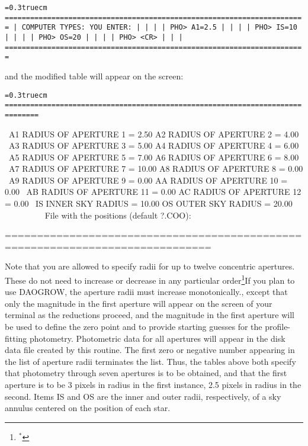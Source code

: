 \bigskip
{\noindent\obeylines\obeyspaces\frenchspacing\tt\baselineskip=0.3truecm
=======================================================================
| COMPUTER TYPES:                                  YOU ENTER:         |
|                                                                     |
| PHO>                                             A1=2.5             |
|                                                                     |
| PHO>                                             IS=10              |
|                                                                     |
| PHO>                                             OS=20              |
|                                                                     |
| PHO>                                             <CR>               |
|                                                                     |
=======================================================================
}
\bigskip

\noindent and the modified table will appear on the screen:

\bigskip
{\noindent\obeylines\obeyspaces\frenchspacing\tt\baselineskip=0.3truecm
==============================================================================

\ A1  RADIUS OF APERTURE  1 =     2.50    A2  RADIUS OF APERTURE  2 =     4.00
\ A3  RADIUS OF APERTURE  3 =     5.00    A4  RADIUS OF APERTURE  4 =     6.00
\ A5  RADIUS OF APERTURE  5 =     7.00    A6  RADIUS OF APERTURE  6 =     8.00
\ A7  RADIUS OF APERTURE  7 =    10.00    A8  RADIUS OF APERTURE  8 =     0.00
\ A9  RADIUS OF APERTURE  9 =     0.00    AA  RADIUS OF APERTURE 10 =     0.00
\ AB  RADIUS OF APERTURE 11 =     0.00    AC  RADIUS OF APERTURE 12 =     0.00
\ IS       INNER SKY RADIUS =    10.00    OS       OUTER SKY RADIUS =    20.00
~~~~~~~~
\         File with the positions (default ?.COO):

==============================================================================
}
\bigskip

\noindent Note that you are allowed to specify radii for up to twelve
concentric apertures.  These do not need to increase or decrease in any
particular order\footnote{$^*$}{If you plan to use DAOGROW, the
aperture radii must increase monotonically.}, except that only the
magnitude in the first aperture will appear on the screen of your
terminal as the reductions proceed, and the magnitude in the first
aperture will be used to define the zero point and to provide starting
guesses for the profile-fitting photometry. Photometric data for all
apertures will appear in the disk data file created by this routine.
The first zero or negative number appearing in the list of aperture
radii terminates the list.  Thus, the tables above both specify that
photometry through seven apertures is to be obtained, and that the
first aperture is to be 3 pixels in radius in the first instance, 2.5
pixels in radius in the second.  Items IS and OS are the inner and
outer radii, respectively, of a sky annulus centered on the position of
each star.

